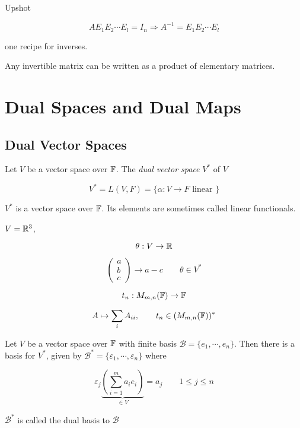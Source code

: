 \documentclass[a4paper]{article}
\begin{document}
Upshot 

\[ A E_{1} E_{2} \cdots E_{l} = I_{n} \Rightarrow A^{-1} = E_{1} E_{2} \cdots E_{l} \]

one recipe for inverses.

\begin{prop} 
	Any invertible matrix can be written as a product of elementary matrices.
\end{prop}


\section{Dual Spaces and Dual Maps}
\subsection{Dual Vector Spaces}

\begin{defi}
	Let $ V $ be a vector space over $ \mathbb{F} $. The \emph{dual vector space} $ V^{*} $ of $ V $
	
	\[ V^{*} = L(V,F) = \{ \alpha : V \to F \text{ linear } \}  \]
\end{defi}

$ V^{*} $ is a vector space over $ \mathbb{F} $. Its elements are sometimes called linear functionals. 

\begin{eg}
	$ V = \mathbb{R}^{3} $,
	
	\[ \theta: V \to \mathbb{R} \]
	
	\[ \begin{pmatrix}
	a \\
	b\\
	c
	\end{pmatrix} \to a - c \qquad \theta \in V^{*} \]
\end{eg}

\begin{eg}
	\[ t_{n}:  M_{m,n}(\mathbb{F}) \to \mathbb{F} \]
	
	\[ A \mapsto \sum_{i} A_{ii}, \qquad t_{n} \in (M_{m,n}(\mathbb{F}))^{*} \]
\end{eg}

\begin{lemma} 
	Let $ V $ be a vector space over $ \mathbb{F} $ with finite basis $ \mathcal{B} = \{ e_{1},\cdots,e_{n} \} $. Then there is a basis for $ V^{*} $, given by $ \mathcal{B}^{*} = \{  \varepsilon_{1},\cdots,\varepsilon_{n} \}  $ where 
	
	\[ \varepsilon_{j} \underbrace{\left(   \sum_{i=1}^{m}  a_{i} e_{i}  \right) }_{\in V} = a_{j}  \qquad 1 \leq j \leq n \]
	
	$ \mathcal{B}^{*} $ is called the dual basis to $ \mathcal{B} $
\end{lemma}
\end{document}
